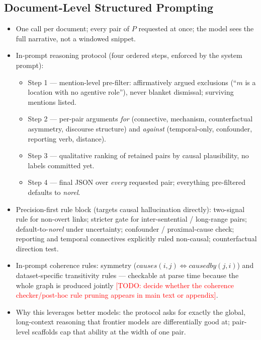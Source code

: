 \documentclass[11pt]{article}
\newcommand{\todo}[1]{\textcolor{red}{[TODO: #1]}}
\begin{document}
\subsection{Document-Level Structured Prompting}
\label{sec:docprompt}
\begin{itemize}
  \item One call per document; every pair of $P$ requested at once; the model
        sees the full narrative, not a windowed snippet.
  \item In-prompt reasoning protocol (four ordered steps, enforced by the
        system prompt):
        \begin{itemize}
          \item Step 1 --- mention-level pre-filter: affirmatively argued
                exclusions (``$m$ is a location with no agentive role''), never
                blanket dismissal; surviving mentions listed.
          \item Step 2 --- per-pair arguments \emph{for} (connective, mechanism,
                counterfactual asymmetry, discourse structure) and
                \emph{against} (temporal-only, confounder, reporting verb,
                distance).
          \item Step 3 --- qualitative ranking of retained pairs by causal
                plausibility, no labels committed yet.
          \item Step 4 --- final JSON over \emph{every} requested pair;
                everything pre-filtered defaults to \textit{norel}.
        \end{itemize}
  \item Precision-first rule block (targets causal hallucination directly):
        two-signal rule for non-overt links; stricter gate for inter-sentential
        / long-range pairs; default-to-\textit{norel} under uncertainty;
        confounder / proximal-cause check; reporting and temporal connectives
        explicitly ruled non-causal; counterfactual direction test.
  \item In-prompt coherence rules: symmetry
        ($\textit{causes}(i,j) \Leftrightarrow \textit{causedby}(j,i)$) and
        dataset-specific transitivity rules --- checkable at parse time because
        the whole graph is produced jointly \todo{decide whether the coherence
        checker/post-hoc rule pruning appears in main text or appendix}.
  \item Why this leverages better models: the protocol asks for exactly the
        global, long-context reasoning that frontier models are differentially
        good at; pair-level scaffolds cap that ability at the width of one pair.
\end{itemize}
\end{document}
